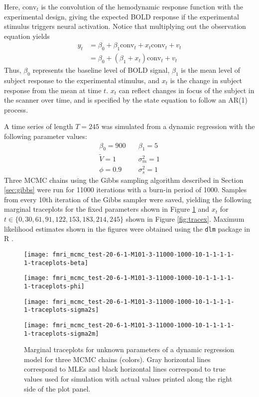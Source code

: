 \documentclass{article}
\begin{document}
\noindent Here, $\mbox{conv}_t$ is the convolution of the hemodynamic response function with the experimental design, giving the expected BOLD response if the experimental stimulus triggers neural activation. Notice that multiplying out the observation equation yields
\begin{align*}
y_t &= \beta_0 + \beta_1\mbox{conv}_t + x_t\mbox{conv}_t + v_t \\
    &= \beta_0 + (\beta_1 + x_t)\mbox{conv}_t + v_t
\end{align*}
Thus, $\beta_0$ represents the baseline level of BOLD signal, $\beta_1$ is the mean level of subject response to the experimental stimulus, and $x_t$ is the change in subject response from the mean at time $t$. $x_t$ can reflect changes in focus of the subject in the scanner over time, and is specified by the state equation to follow an AR(1) process.

A time series of length $T = 245$ was simulated from a dynamic regression with the following parameter values:
\begin{align*}
\beta_0 = 900 &\quad \beta_1 = 5 \\
\tilde{V} = 1 &\quad \sigma_m^2 = 1 \\
\phi = 0.9 &\quad \sigma_s^2 = 1
\end{align*}
Three MCMC chains using the Gibbs sampling algorithm described in Section \ref{sec:gibbs} were run for 11000 iterations with a burn-in period of 1000. Samples from every 10th iteration of the Gibbs sampler were saved, yielding the following marginal traceplots for the fixed parameters shown in Figure \ref{fig:tracetheta} and $x_t$ for $t \in \{0, 30, 61, 91, 122, 153, 183, 214, 245\}$ shown in Figure \ref{fig:tracex}. Maximum likelihood estimates shown in the figures were obtained using the {\tt dlm} package in R \citep{petris2009dynamic}.

\begin{figure}[ht]
\begin{minipage}{0.5\linewidth}
\texttt{[image: fmri\_mcmc\_test-20-6-1-M101-3-11000-1000-10-1-1-1-1-1-traceplots-beta]}
\end{minipage}
\begin{minipage}{0.5\linewidth}
\texttt{[image: fmri\_mcmc\_test-20-6-1-M101-3-11000-1000-10-1-1-1-1-1-traceplots-phi]}
\end{minipage}
\begin{minipage}{0.5\linewidth}
\texttt{[image: fmri\_mcmc\_test-20-6-1-M101-3-11000-1000-10-1-1-1-1-1-traceplots-sigma2s]}
\end{minipage}
\begin{minipage}{0.5\linewidth}
\texttt{[image: fmri\_mcmc\_test-20-6-1-M101-3-11000-1000-10-1-1-1-1-1-traceplots-sigma2m]}
\end{minipage}
\caption{Marginal traceplots for unknown parameters of a dynamic regression model for three MCMC chains (colors). Gray horizontal lines correspond to MLEs and black horizontal lines correspond to true values used for simulation with actual values printed along the right side of the plot panel.} \label{fig:tracetheta}
\end{figure}
\end{document}
